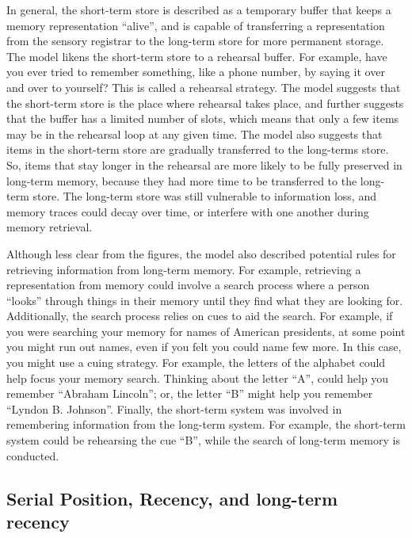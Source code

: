 \documentclass[
  oneside,
  12pt]{crumpbook}
\begin{document}
In general, the short-term store is described as a temporary buffer that keeps a memory representation ``alive'', and is capable of transferring a representation from the sensory registrar to the long-term store for more permanent storage. The model likens the short-term store to a rehearsal buffer. For example, have you ever tried to remember something, like a phone number, by saying it over and over to yourself? This is called a rehearsal strategy. The model suggests that the short-term store is the place where rehearsal takes place, and further suggests that the buffer has a limited number of slots, which means that only a few items may be in the rehearsal loop at any given time. The model also suggests that items in the short-term store are gradually transferred to the long-terms store. So, items that stay longer in the rehearsal are more likely to be fully preserved in long-term memory, because they had more time to be transferred to the long-term store. The long-term store was still vulnerable to information loss, and memory traces could decay over time, or interfere with one another during memory retrieval.

Although less clear from the figures, the model also described potential rules for retrieving information from long-term memory. For example, retrieving a representation from memory could involve a search process where a person ``looks'' through things in their memory until they find what they are looking for. Additionally, the search process relies on cues to aid the search. For example, if you were searching your memory for names of American presidents, at some point you might run out names, even if you felt you could name few more. In this case, you might use a cuing strategy. For example, the letters of the alphabet could help focus your memory search. Thinking about the letter ``A'', could help you remember ``Abraham Lincoln''; or, the letter ``B'' might help you remember ``Lyndon B. Johnson''. Finally, the short-term system was involved in remembering information from the long-term system. For example, the short-term system could be rehearsing the cue ``B'', while the search of long-term memory is conducted.

\hypertarget{serial-position-recency-and-long-term-recency}{%
\subsection{Serial Position, Recency, and long-term recency}\label{serial-position-recency-and-long-term-recency}}
\end{document}
